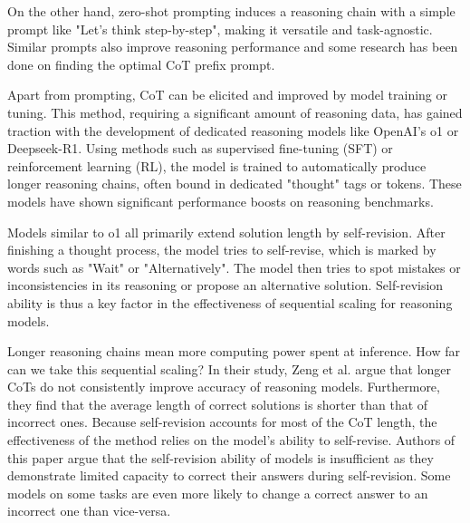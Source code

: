 On the other hand, zero-shot prompting induces a reasoning chain with a simple prompt like "Let's think step-by-step",
making it versatile and task-agnostic\cite{NEURIPS2022_8bb0d291}. Similar prompts also improve reasoning performance and 
some research\cite{yang2024largelanguagemodelsoptimizers} has been done on finding the optimal CoT prefix prompt.

Apart from prompting, CoT can be elicited and improved by model training or tuning. 
This method, requiring a significant amount of reasoning data\cite{wang2024chainofthoughtreasoningprompting},
has gained traction with the development of dedicated reasoning models like OpenAI's o1\cite{openai2024openaio1card} or Deepseek-R1\cite{deepseekai2025deepseekr1incentivizingreasoningcapability}.
Using methods such as supervised fine-tuning (SFT) or reinforcement learning (RL), the model is trained to
automatically produce longer reasoning chains, often bound in dedicated "thought" tags or tokens. 
These models have shown significant performance boosts on reasoning benchmarks\cite{openai2024openaio1card}\cite{deepseekai2025deepseekr1incentivizingreasoningcapability}.

Models similar to o1 all primarily extend solution length by self-revision\cite{zeng2025revisitingtesttimescalingo1like}.
After finishing a thought process, the model tries to self-revise, which is marked by words such as "Wait" or "Alternatively". 
The model then tries to spot mistakes or inconsistencies in its reasoning or propose an alternative solution. 
Self-revision ability is thus a key factor in the effectiveness of sequential scaling for reasoning models\cite{zeng2025revisitingtesttimescalingo1like}.

Longer reasoning chains mean more computing power spent at inference. How far can we take this sequential scaling?
In their study, Zeng et al.\cite{zeng2025revisitingtesttimescalingo1like} argue that longer CoTs do not consistently improve accuracy of reasoning models.
Furthermore, they find that the average length of correct solutions is shorter than that of incorrect ones. 
\newpage
Because self-revision accounts for most of the CoT length, the effectiveness of the method relies on the model's ability to self-revise.
Authors of this paper argue that the self-revision ability of models is insufficient as they demonstrate limited capacity to correct their answers
during self-revision. Some models on some tasks are even more likely to change a correct answer to an incorrect one than vice-versa.


